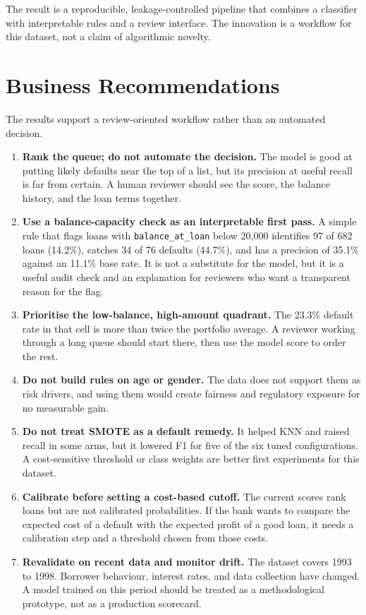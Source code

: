 The result is a reproducible, leakage-controlled pipeline that combines a classifier with interpretable rules and a review interface. The innovation is a workflow for this dataset, not a claim of algorithmic novelty.

\section{Business Recommendations}
\label{sec:recommendations}

The results support a review-oriented workflow rather than an automated decision.

\begin{enumerate}
    \item \textbf{Rank the queue; do not automate the decision.} The model is good at putting likely defaults near the top of a list, but its precision at useful recall is far from certain. A human reviewer should see the score, the balance history, and the loan terms together.
    \item \textbf{Use a balance-capacity check as an interpretable first pass.} A simple rule that flags loans with \texttt{balance\_at\_loan} below 20,000 identifies 97 of 682 loans (14.2\%), catches 34 of 76 defaults (44.7\%), and has a precision of 35.1\% against an 11.1\% base rate. It is not a substitute for the model, but it is a useful audit check and an explanation for reviewers who want a transparent reason for the flag.
    \item \textbf{Prioritise the low-balance, high-amount quadrant.} The 23.3\% default rate in that cell is more than twice the portfolio average. A reviewer working through a long queue should start there, then use the model score to order the rest.
    \item \textbf{Do not build rules on age or gender.} The data does not support them as risk drivers, and using them would create fairness and regulatory exposure for no measurable gain.
    \item \textbf{Do not treat SMOTE as a default remedy.} It helped KNN and raised recall in some arms, but it lowered F1 for five of the six tuned configurations. A cost-sensitive threshold or class weights are better first experiments for this dataset.
    \item \textbf{Calibrate before setting a cost-based cutoff.} The current scores rank loans but are not calibrated probabilities. If the bank wants to compare the expected cost of a default with the expected profit of a good loan, it needs a calibration step and a threshold chosen from those costs.
    \item \textbf{Revalidate on recent data and monitor drift.} The dataset covers 1993 to 1998. Borrower behaviour, interest rates, and data collection have changed. A model trained on this period should be treated as a methodological prototype, not as a production scorecard.
\end{enumerate}

